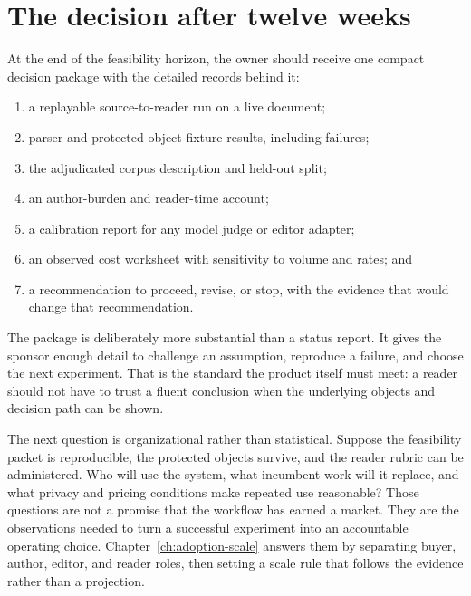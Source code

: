 \section{The decision after twelve weeks}

At the end of the feasibility horizon, the owner should receive one compact
decision package with the detailed records behind it:

\begin{enumerate}
\item a replayable source-to-reader run on a live document;
\item parser and protected-object fixture results, including failures;
\item the adjudicated corpus description and held-out split;
\item an author-burden and reader-time account;
\item a calibration report for any model judge or editor adapter;
\item an observed cost worksheet with sensitivity to volume and rates; and
\item a recommendation to proceed, revise, or stop, with the evidence that
      would change that recommendation.
\end{enumerate}

The package is deliberately more substantial than a status report. It gives
the sponsor enough detail to challenge an assumption, reproduce a failure,
and choose the next experiment. That is the standard the product itself must
meet: a reader should not have to trust a fluent conclusion when the underlying
objects and decision path can be shown.

The next question is organizational rather than statistical. Suppose the
feasibility packet is reproducible, the protected objects survive, and the
reader rubric can be administered. Who will use the system, what incumbent
work will it replace, and what privacy and pricing conditions make repeated use
reasonable? Those questions are not a promise that the workflow has earned a
market. They are the observations needed to turn a successful experiment into
an accountable operating choice. Chapter~\ref{ch:adoption-scale} answers them
by separating buyer, author, editor, and reader roles, then setting a scale
rule that follows the evidence rather than a projection.
